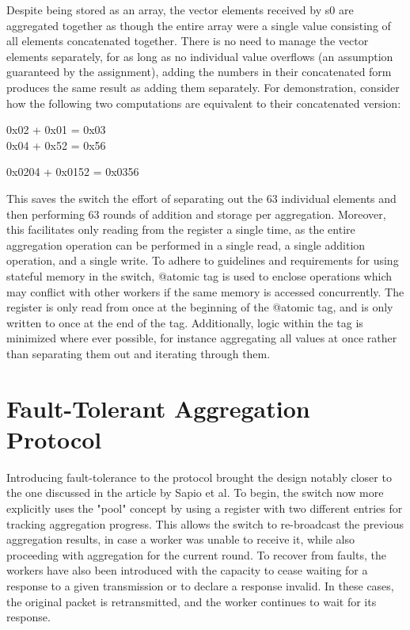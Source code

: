 \documentclass[a4paper,11pt]{article}
\begin{document}
Despite being stored as an array, the vector elements received by s0 are aggregated together as though the entire array were a single value consisting of all elements concatenated together. There is no need to manage the vector elements separately, for as long as no individual value overflows (an assumption guaranteed by the assignment), adding the numbers in their concatenated form produces the same result as adding them separately. For demonstration, consider how the following two computations are equivalent to their concatenated version:
\begin{center}
0x02 + 0x01 = 0x03\\
0x04 + 0x52 = 0x56
\end{center}
\begin{center}
0x0204 + 0x0152 = 0x0356
\end{center}
This saves the switch the effort of separating out the 63 individual elements and then performing 63 rounds of addition and storage per aggregation. Moreover, this facilitates only reading from the register a single time, as the entire aggregation operation can be performed in a single read, a single addition operation, and a single write.\newline
To adhere to guidelines and requirements for using stateful memory in the switch, @atomic tag is used to enclose operations which may conflict with other workers if the same memory is accessed concurrently. The register is only read from once at the beginning of the @atomic tag, and is only written to once at the end of the tag. Additionally, logic within the tag is minimized where ever possible, for instance aggregating all values at once rather than separating them out and iterating through them.

\section{Fault-Tolerant Aggregation Protocol}
Introducing fault-tolerance to the protocol brought the design notably closer to the one discussed in the article by Sapio et al. To begin, the switch now more explicitly uses the "pool" concept by using a register with two different entries for tracking aggregation progress. This allows the switch to re-broadcast the previous aggregation results, in case a worker was unable to receive it, while also proceeding with aggregation for the current round.\newline
To recover from faults, the workers have also been introduced with the capacity to cease waiting for a response to a given transmission or to declare a response invalid. In these cases, the original packet is retransmitted, and the worker continues to wait for its response.
\end{document}

